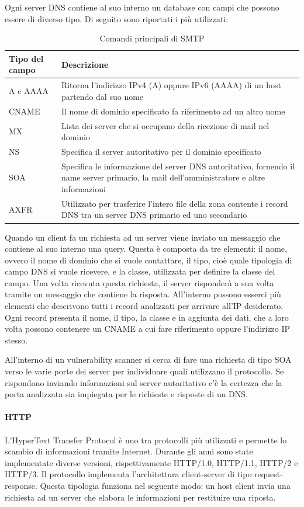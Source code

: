 \documentclass[12pt]{report}
\begin{document}
Ogni server DNS contiene al suo interno un database con campi che possono essere di diverso tipo. Di seguito sono riportati i più utilizzati:
\begin{table}[htbp]
\centering
\begin{tabular}{@{}m{3cm}m{11cm}@{}}
\toprule
\textbf{Tipo del campo} & \textbf{Descrizione} \\ \midrule
A e AAAA & Ritorna l'indirizzo IPv4 (A) oppure IPv6 (AAAA) di un host partendo dal suo nome \\ \hline
CNAME & Il nome di dominio specificato fa riferimento ad un altro nome \\ \hline
MX & Lista dei server che si occupano della ricezione di mail nel dominio \\ \hline
NS & Specifica il server autoritativo per il dominio specificato \\ \hline
SOA & Specifica le informazione del server DNS autoritativo, fornendo il name server primario, la mail dell'amministratore e altre informazioni \\ \hline
AXFR & Utilizzato per trasferire l'intero file della zona contente i record DNS tra un server DNS primario ed uno secondario \\ \bottomrule
\end{tabular}
\caption{Comandi principali di SMTP}
\label{tab:tipi_DNS}
\end{table}

Quando un client fa un richiesta ad un server viene inviato un messaggio che contiene al suo interno una query. Questa è composta da tre elementi: il nome, ovvero il nome di dominio che si vuole contattare, il tipo, cioè quale tipologia di campo DNS si vuole ricevere, e la classe, utilizzata per definire la classe del campo. Una volta ricevuta questa richiesta, il server risponderà a sua volta tramite un messaggio che contiene la risposta. All'interno possono esserci più elementi che descrivono tutti i record analizzati per arrivare all'IP desiderato. Ogni record presenta il nome, il tipo, la classe e in aggiunta dei dati, che a loro volta possono contenere un CNAME a cui fare riferimento oppure l'indirizzo IP stesso.

All'interno di un vulnerability scanner si cerca di fare una richiesta di tipo SOA verso le varie porte dei server per individuare quali utilizzano il protocollo. Se rispondono inviando informazioni sul server autoritativo c'è la certezza che la porta analizzata sia impiegata per le richieste e risposte di un DNS.
\\\\
\textbf{HTTP}
\\\\
L'HyperText Transfer Protocol è uno tra protocolli più utilizzati e permette lo scambio di informazioni tramite Internet. Durante gli anni sono state implementate diverse versioni, rispettivamente HTTP/1.0, HTTP/1.1, HTTP/2 e HTTP/3. Il protocollo implementa l'architettura client-server di tipo request-response. Questa tipologia funziona nel seguente modo: un host client invia una richiesta ad un server che elabora le informazioni per restituire una riposta. \cite{rfcHTTP}
\end{document}
